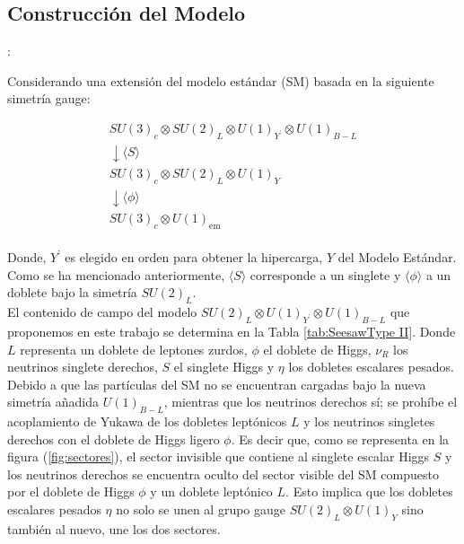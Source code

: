 \documentclass[12pt]{article}
\begin{document}

\subsection{Construcción del Modelo }:


Considerando una extensión del modelo estándar (SM) basada en la siguiente simetría gauge: 

\begin{equation}
\begin{aligned}
 SU(3)_c \otimes SU(2)_L \otimes U(1)_{Y^ \text{'}} \otimes U(1)_{B-L}  \\
    \downarrow \langle S \rangle  \\
    SU(3)_c \otimes SU(2)_L \otimes U(1)_{Y} \\
     \downarrow \langle \phi \rangle  \\
     SU(3)_c \otimes  U(1)_{\text{em}}
\end{aligned}
\end{equation}\\

Donde, $Y^ \text{'} $ es elegido en orden para obtener la hipercarga, $Y$ del Modelo Estándar. Como se ha mencionado anteriormente, $\langle S \rangle $ corresponde a un singlete y $\langle \phi \rangle$ a un doblete bajo la simetría $SU(2)_L$.  \\


El contenido de campo del modelo $SU(2)_L\otimes U(1)_{Y^ \text{'}} \otimes U(1)_{B-L} $ que proponemos en este trabajo se determina en la Tabla \ref{tab:SeesawType II}. Donde $L$ representa un doblete de leptones zurdos, $\phi$ el doblete de Higgs, $\nu_R$ los neutrinos singlete derechos, $S$ el singlete Higgs y $\eta$ los dobletes escalares pesados. Debido a que las partículas del SM no se encuentran cargadas bajo la nueva simetría añadida $U(1)_{B-L}$, mientras que los neutrinos derechos sí; se prohíbe el acoplamiento de Yukawa de los dobletes leptónicos $L$ y los neutrinos singletes derechos con el doblete de Higgs ligero $\phi$. Es decir que, como se representa en la figura (\ref{fig:sectores}), el sector invisible que contiene al singlete escalar Higgs $S$ y los neutrinos derechos se encuentra oculto del sector visible del SM compuesto por el doblete de Higgs $\phi$ y un doblete leptónico $L$. Esto implica que los dobletes escalares pesados $\eta$ no solo se unen al grupo gauge $SU(2)_L \otimes U(1)_Y$ sino también al nuevo, une los dos sectores.\cite{Hong}  \\
\end{document}
